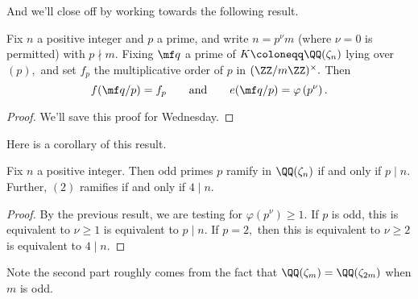 \documentclass[../notes.tex]{subfiles}
\begin{document}
And we'll close off by working towards the following result.
\begin{proposition}
	Fix $n$ a positive integer and $p$ a prime, and write $n=p^\nu m$ (where $\nu=0$ is permitted) with $p\nmid m.$ Fixing $\mf q$ a prime of $K\coloneqq \QQ(\zeta_n)$ lying over $(p),$ and set $f_p$ the multiplicative order of $p$ in $(\ZZ/m\ZZ)^\times.$ Then
	\[f(\mf q/p)=f_p\qquad\text{and}\qquad e(\mf q/p)=\varphi\left(p^\nu\right).\]
\end{proposition}
\begin{proof}
	We'll save this proof for Wednesday.
\end{proof}
Here is a corollary of this result.
\begin{corollary}
	Fix $n$ a positive integer. Then odd primes $p$ ramify in $\QQ(\zeta_n)$ if and only if $p\mid n.$ Further, $(2)$ ramifies if and only if $4\mid n.$
\end{corollary}
\begin{proof}
	By the previous result, we are testing for $\varphi\left(p^\nu\right)\ge1.$ If $p$ is odd, this is equivalent to $\nu\ge1$ is equivalent to $p\mid n.$ If $p=2,$ then this is equivalent to $\nu\ge2$ is equivalent to $4\mid n.$
\end{proof}
Note the second part roughly comes from the fact that $\QQ(\zeta_m)=\QQ(\zeta_{2m})$ when $m$ is odd.
\end{document}
